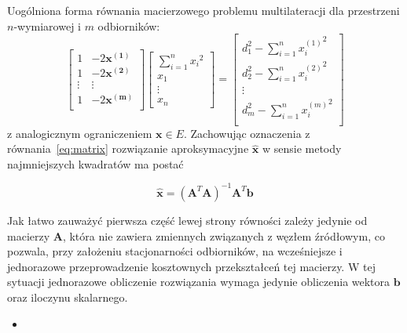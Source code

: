 Uogólniona forma równania macierzowego problemu multilateracji dla przestrzeni $n$-wymiarowej i $m$ odbiorników:
\begin{equation}
    \left[
        \begin{matrix}
            1 & -2\mathbf{x^{(1)}}\\
            1 & -2\mathbf{x^{(2)}}\\
            \vdots & \vdots\\
            1 & -2\mathbf{x^{(m)}}\\
        \end{matrix}
    \right]
    \left[
        \begin{matrix}
            \sum_{i=1}^{n}{x_i}^2\\
            x_1\\
            \vdots\\
            x_n
        \end{matrix}
    \right]
    =
    \left[
        \begin{matrix}
            d_1^2 - \sum_{i=1}^{n}{x_i^{(1)}}^2\\
            d_2^2 - \sum_{i=1}^{n}{x_i^{(2)}}^2\\
            \vdots\\
            d_m^2 - \sum_{i=1}^{n}{x_i^{(m)}}^2\\
        \end{matrix}
    \right]
\end{equation}
z analogicznym ograniczeniem $\mathbf{x} \in E$. Zachowując oznaczenia z równania~\ref{eq:matrix} rozwiązanie aproksymacyjne $\hat{\mathbf{x}}$ w sensie metody najmniejszych kwadratów ma postać

\begin{equation}\label{eq:lls}
    \hat{\mathbf{x}} = {\left(\mathbf{A}^T\mathbf{A}\right)}^{-1}\mathbf{A}^T\mathbf{b}
\end{equation}

Jak łatwo zauważyć pierwsza część lewej strony równości zależy jedynie od macierzy $\mathbf{A}$, która nie zawiera zmiennych związanych z węzłem źródłowym, co pozwala, przy założeniu stacjonarności odbiorników, na wcześniejsze i jednorazowe przeprowadzenie kosztownych przekształceń tej macierzy. W tej sytuacji jednorazowe obliczenie rozwiązania wymaga jedynie obliczenia wektora $\mathbf{b}$ oraz iloczynu skalarnego.

\begin{itemize}
    \item 
\end{itemize}

